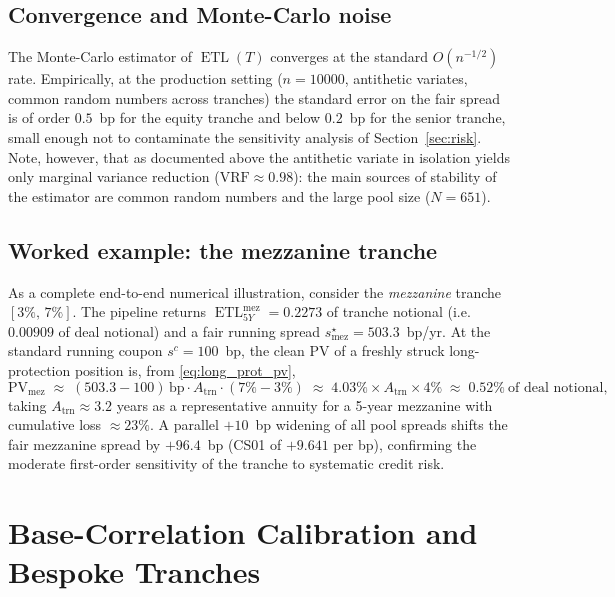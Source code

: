 \documentclass[11pt,a4paper]{article}
\newcommand{\1}{\mathbf{1}}
\DeclareMathOperator{\ETL}{ETL}
\begin{document}
\subsection{Convergence and Monte-Carlo noise}
The Monte-Carlo estimator of \(\ETL(T)\) converges at the standard
\(O(n^{-1/2})\) rate. Empirically, at the production setting
(\(n=\num{10000}\), antithetic variates, common random numbers across
tranches) the standard error on the fair spread is of order
\(0.5\)~bp for the equity tranche and below \(0.2\)~bp for the
senior tranche, small enough not to contaminate the
sensitivity analysis of Section~\ref{sec:risk}. Note, however,
that as documented above the antithetic
variate in isolation yields only marginal variance reduction
(\(\mathrm{VRF}\approx 0.98\)): the main sources of stability of
the estimator are common random numbers and the large pool size
(\(N=651\)).

\subsection{Worked example: the mezzanine tranche}
As a complete end-to-end numerical illustration, consider the
\emph{mezzanine} tranche \([3\%,\,7\%]\). The pipeline returns
\(\ETL_{5Y}^{\mathrm{mez}} = 0.2273\) of tranche notional (i.e.\
\(0.00909\) of deal notional) and a fair running spread
\(s^{\star}_{\mathrm{mez}} = 503.3\)~bp/yr. At the standard running
coupon \(s^{c}=100\)~bp, the clean PV of a freshly struck
long-protection position is, from \eqref{eq:long_prot_pv},
\begin{equation*}
\mathrm{PV}_{\mathrm{mez}} \;\approx\; (503.3-100)\,\mathrm{bp}
\cdot A_{\mathrm{trn}}\cdot (7\%-3\%)
\;\approx\; 4.03\%\times A_{\mathrm{trn}}\times 4\%
\;\approx\; 0.52\%\ \text{of deal notional},
\end{equation*}
taking \(A_{\mathrm{trn}}\!\approx\!3.2\) years as a representative
annuity for a 5-year mezzanine with cumulative loss \(\approx 23\%\).
A parallel \(+10\)~bp widening of all pool spreads shifts the fair
mezzanine spread by \(+96.4\)~bp (CS01 of \(+9.641\) per bp), confirming
the moderate first-order sensitivity of the tranche to systematic
credit risk.

\section{Base-Correlation Calibration and Bespoke Tranches}\label{sec:calib}
\end{document}
